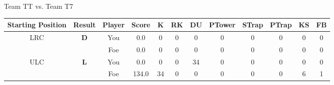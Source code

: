\documentclass[a4paper,12pt]{article}
\begin{document}
  \vspace*{2em}
  \par {\large {\color{Gray} Team} TT {\color{Gray}
      vs. Team} T7}
  \newline
  \begin{tabular}[t]{| c | c | c | c | c | c | c | c | c | c | c | c
      |}
    \hline
    Starting Position & \textbf{Result} & Player & \textbf{Score} & K & RK & DU & PTower & STrap & PTrap & KS & FB \\
    
      
                      
      
        \hline
        \multirow{2}{*}{  LRC
             } &
              \multirow{2}{*}{  
                  \textbf{D}  } & 
                    \cellcolor{yellow!25} You & \cellcolor{yellow!25} 0.0 & \cellcolor{yellow!25} 0 &
                    \cellcolor{yellow!25} 0 & \cellcolor{yellow!25} 0 & \cellcolor{yellow!25} 0 &
                    \cellcolor{yellow!25} 0 & \cellcolor{yellow!25} 0 & \cellcolor{yellow!25} 0 &
                    \cellcolor{yellow!25} 0 \\
                    \cline{3-12}
                    & & \cellcolor{red!15} Foe & \cellcolor{red!15} 0.0 & \cellcolor{red!15} 0 & \cellcolor{red!15}
                    0 & \cellcolor{red!15} 0
                    & \cellcolor{red!15} 0 & \cellcolor{red!15}
                    0 & \cellcolor{red!15} 0 
                    & \cellcolor{red!15} 0 & \cellcolor{red!15}
                    0 \\
                    
                      
      
                      
      
                      
      
                      
      
                      
      
        \hline
        \multirow{2}{*}{  ULC  } &
              \multirow{2}{*}{  \textbf{L}  } & 
                    \cellcolor{yellow!25} You & \cellcolor{yellow!25} 0.0 & \cellcolor{yellow!25} 0 &
                    \cellcolor{yellow!25} 0 & \cellcolor{yellow!25} 34 & \cellcolor{yellow!25} 0 &
                    \cellcolor{yellow!25} 0 & \cellcolor{yellow!25} 0 & \cellcolor{yellow!25} 0 &
                    \cellcolor{yellow!25} 0 \\
                    \cline{3-12}
                    & & \cellcolor{red!15} Foe & \cellcolor{red!15} 134.0 & \cellcolor{red!15} 34 & \cellcolor{red!15}
                    0 & \cellcolor{red!15} 0
                    & \cellcolor{red!15} 0 & \cellcolor{red!15}
                    0 & \cellcolor{red!15} 0 
                    & \cellcolor{red!15} 6 & \cellcolor{red!15}
                    1 \\
                    

\end{tabular}
\end{document}
